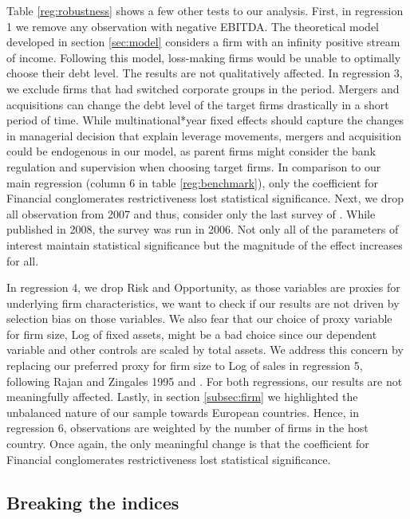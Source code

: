 \documentclass[12pt]{article}
\begin{document}
	
	Table \ref{reg:robustness} shows a few other tests to our analysis. First, in regression 1 we remove any observation with negative EBITDA. The theoretical model developed in section \ref{sec:model} considers a firm with an infinity positive stream of income. Following this model, loss-making firms would be unable to optimally choose their debt level. The results are not qualitatively affected. In regression 3, we exclude firms that had switched corporate groups in the period. Mergers and acquisitions can change the debt level of the target firms drastically in a short period of time. While multinational*year fixed effects should capture the changes in managerial decision that explain leverage movements, mergers and acquisition could be endogenous in our model, as parent firms might consider the bank regulation and supervision when choosing target firms. In comparison to our main regression (column 6 in table \ref{reg:benchmark}), only the coefficient for Financial conglomerates restrictiveness lost statistical significance. Next, we drop all observation from 2007 and thus, consider only the last survey of \cite{barth2013bank}. While published in 2008, the \cite{barth2008bank} survey was run in 2006. Not only all of the parameters of interest maintain statistical significance but the magnitude of the effect increases for all.
	

	
	In regression 4, we drop Risk and Opportunity, as those variables are proxies for underlying firm characteristics, we want to check if our results are not driven by selection bias on those variables. We also fear that our choice of proxy variable for firm size, Log of fixed assets, might be a bad choice since our dependent variable and other controls are scaled by total assets. We address this concern by replacing our preferred proxy for firm size to Log of sales in regression 5, following  Rajan and Zingales 1995 and \cite{huizinga2008capital}. For both regressions, our results are not meaningfully affected. Lastly, in section \ref{subsec:firm} we highlighted the unbalanced nature of our sample towards European countries. Hence, in regression 6, observations are weighted by the number of firms in the host country. Once again, the only meaningful change is that the coefficient for Financial conglomerates restrictiveness lost statistical significance. 		

\subsection{Breaking the indices} \label{sec:sub_index}
\end{document}

